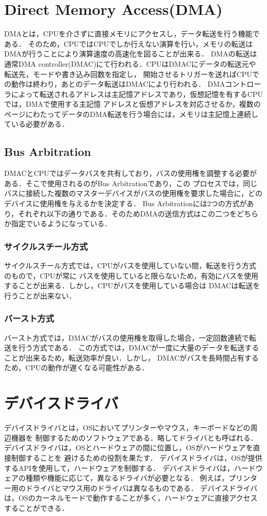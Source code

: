 \documentclass[a4paper,11pt]{ltjsarticle}
\begin{document}
\section{Direct Memory Access(DMA)}
DMAとは，CPUを介さずに直接メモリにアクセスし，データ転送を行う機能である．
そのため，CPUではCPUでしか行えない演算を行い，メモリの転送はDMAが行うことにより演算速度の高速化を図ることが出来る．
DMAの転送は通常DMA controller(DMAC)にて行われる．CPUはDMACにデータの転送元や転送先，モードや書き込み回数を指定し，
開始させるトリガーを送ればCPUでの動作は終わり，あとのデータ転送はDMACにより行われる．
DMAコントローラによって転送されるアドレスは主記憶アドレスであり，仮想記憶を有するCPUでは，DMAで使用する主記憶
アドレスと仮想アドレスを対応させるか，複数のページにわたってデータのDMA転送を行う場合には，メモリは主記憶上連続している必要がある．
\subsection{Bus Arbitration}
DMACとCPUではデータバスを共有しており，バスの使用権を調整する必要がある．そこで使用されるのがBus Arbitrationであり，この
プロセスでは，同じバスに接続した複数のマスターデバイスがバスの使用権を要求した場合に，どのデバイスに使用権を与えるかを決定する．
Bus Arbitrationには2つの方式があり，それぞれ以下の通りである．そのためDMAの送信方式はこの二つをどちらか指定でいるようになっている．
\subsubsection{サイクルスチール方式}
サイクルスチール方式では，CPUがバスを使用していない間，転送を行う方式のもので，CPUが常に
バスを使用していると限らないため，有効にバスを使用することが出来る．しかし，CPUがバスを使用している場合は
DMACは転送を行うことが出来ない．
\subsubsection{バースト方式}
バースト方式では，DMACがバスの使用権を取得した場合，一定回数連続で転送を行う方式である．
この方式では，DMACが一度に大量のデータを転送することが出来るため，転送効率が良い．しかし，
DMACがバスを長時間占有するため，CPUの動作が遅くなる可能性がある．
\section{デバイスドライバ}
デバイスドライバとは，OSにおいてプリンターやマウス，キーボードなどの周辺機器を
制御するためのソフトウェアである．略してドライバとも呼ばれる．
デバイスドライバは，OSとハードウェアの間に位置し，OSがハードウェアを直接制御することを
避けるための役割を果たす．
デバイスドライバは，OSが提供するAPIを使用して，ハードウェアを制御する．
デバイスドライバは，ハードウェアの種類や機能に応じて，異なるドライバが必要となる．
例えば，プリンター用のドライバとマウス用のドライバは異なるものである．
デバイスドライバは，OSのカーネルモードで動作することが多く，ハードウェアに直接アクセスすることができる．
\end{document}
